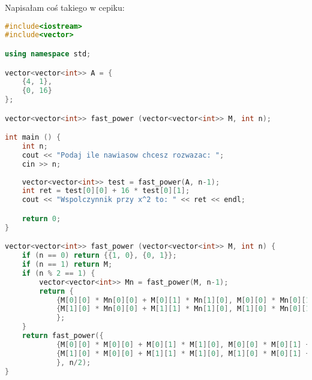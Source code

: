 \documentclass{article}
\begin{document}
Napisałam coś takiego w cepiku:
\begin{lstlisting}[language=c++]
#include<iostream>
#include<vector>

using namespace std;

vector<vector<int>> A = {
    {4, 1},
    {0, 16}
};

vector<vector<int>> fast_power (vector<vector<int>> M, int n);

int main () {
    int n;
    cout << "Podaj ile nawiasow chcesz rozwazac: ";
    cin >> n;
    
    vector<vector<int>> test = fast_power(A, n-1);
    int ret = test[0][0] + 16 * test[0][1];
    cout << "Wspolczynnik przy x^2 to: " << ret << endl;

    return 0;
}

vector<vector<int>> fast_power (vector<vector<int>> M, int n) {
    if (n == 0) return {{1, 0}, {0, 1}};
    if (n == 1) return M;
    if (n % 2 == 1) {
        vector<vector<int>> Mn = fast_power(M, n-1);
        return {
            {M[0][0] * Mn[0][0] + M[0][1] * Mn[1][0], M[0][0] * Mn[0][1] + M[0][1] * Mn[1][1]},
            {M[1][0] * Mn[0][0] + M[1][1] * Mn[1][0], M[1][0] * Mn[0][1] + M[1][1] * Mn[1][1]}
            };
    }
    return fast_power({
            {M[0][0] * M[0][0] + M[0][1] * M[1][0], M[0][0] * M[0][1] + M[0][1] * M[1][1]},
            {M[1][0] * M[0][0] + M[1][1] * M[1][0], M[1][0] * M[0][1] + M[1][1] * M[1][1]}
            }, n/2);
}
\end{lstlisting}
\end{document}
